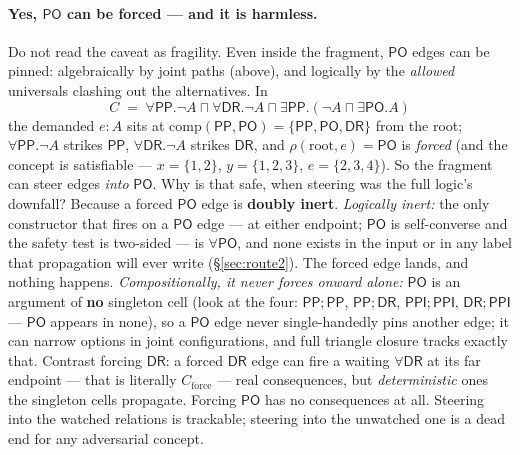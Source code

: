 \documentclass[11pt]{article}
\newcommand{\DR}{\ensuremath{\mathsf{DR}}}
\newcommand{\PO}{\ensuremath{\mathsf{PO}}}
\newcommand{\PP}{\ensuremath{\mathsf{PP}}}
\newcommand{\PPI}{\ensuremath{\mathsf{PPI}}}
\newcommand{\Comp}{\mathrm{comp}}
\begin{document}
\paragraph{Yes, $\PO$ can be forced --- and it is harmless.} Do not
read the caveat as fragility. Even inside the fragment, $\PO$ edges can
be pinned: algebraically by joint paths (above), and logically by the
\emph{allowed} universals clashing out the alternatives. In
\[
C \;=\; \forall\PP.\neg A \sqcap \forall\DR.\neg A \sqcap
        \exists\PP.(\neg A \sqcap \exists\PO.A)
\]
the demanded $e\!:\!A$ sits at $\Comp(\PP,\PO)=\{\PP,\PO,\DR\}$ from
the root; $\forall\PP.\neg A$ strikes $\PP$, $\forall\DR.\neg A$
strikes $\DR$, and $\rho(\mathrm{root},e)=\PO$ is \emph{forced} (and
the concept is satisfiable --- $x=\{1,2\}$, $y=\{1,2,3\}$,
$e=\{2,3,4\}$). So the fragment can steer edges \emph{into} $\PO$. Why
is that safe, when steering was the full logic's downfall? Because a
forced $\PO$ edge is \textbf{doubly inert}. \emph{Logically inert:} the
only constructor that fires on a $\PO$ edge --- at either endpoint;
$\PO$ is self-converse and the safety test is two-sided --- is
$\forall\PO$, and none exists in the input or in any label that
propagation will ever write (\S\ref{sec:route2}). The forced edge
lands, and nothing happens. \emph{Compositionally, it never forces
onward alone:} $\PO$ is an argument of \textbf{no} singleton cell (look
at the four: $\PP;\PP$, $\PP;\DR$, $\PPI;\PPI$, $\DR;\PPI$ --- $\PO$
appears in none), so a $\PO$ edge never single-handedly pins another
edge; it can narrow options in joint configurations, and full triangle
closure tracks exactly that. Contrast forcing $\DR$: a forced $\DR$
edge can fire a waiting $\forall\DR$ at its far endpoint --- that is
literally $C_{\mathrm{force}}$ --- real consequences, but
\emph{deterministic} ones the singleton cells propagate. Forcing $\PO$
has no consequences at all. Steering into the watched relations is
trackable; steering into the unwatched one is a dead end for any
adversarial concept.
\end{document}
